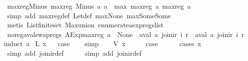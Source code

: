 \begin{isabellebody}
\ max{\isacharunderscore}reg{\isacharunderscore}Minus{\isacharcolon}\ {\isachardoublequoteopen}max{\isacharunderscore}reg\ {\isacharparenleft}Minus\ a{}\ a{}{\isacharparenright}\ {\isacharequal}\ max\ {\isacharparenleft}max{\isacharunderscore}reg\ a{}{\isacharparenright}\ {\isacharparenleft}max{\isacharunderscore}reg\ a{}{\isacharparenright}{\isachardoublequoteclose}\isanewline
%
\isadelimproof
\ \ %
\endisadelimproof
%
\isatagproof
{}\isamarkupfalse%
\ {\isacharparenleft}simp\ add{\isacharcolon}\ max{\isacharunderscore}reg{\isacharunderscore}def\ Let{\isacharunderscore}def\ max{\isacharunderscore}None\ max{\isacharunderscore}Some{\isacharunderscore}Some{\isacharparenright}\isanewline
\ \ \isamarkupfalse%
\ {\isacharparenleft}metis\ List{\isachardot}finite{\isacharunderscore}set\ Max{\isachardot}union\ enumerate{\isacharunderscore}aexp{\isacharunderscore}regs{\isacharunderscore}list{\isacharparenright}%
\endisatagproof
{\isafoldproof}%
%
\isadelimproof
\isanewline
%
\endisadelimproof
\isanewline
{}\isamarkupfalse%
\ no{\isacharunderscore}reg{\isacharunderscore}aval{\isacharunderscore}swap{\isacharunderscore}regs{\isacharcolon}\ {\isachardoublequoteopen}AExp{\isachardot}max{\isacharunderscore}reg\ a\ {\isacharequal}\ None\ {\isasymLongrightarrow}\ aval\ a\ {\isacharparenleft}join{\isacharunderscore}ir\ i\ r{\isacharparenright}\ {\isacharequal}\ aval\ a\ {\isacharparenleft}join{\isacharunderscore}ir\ i\ r{\isacharprime}{\isacharparenright}{\isachardoublequoteclose}\isanewline
%
\isadelimproof
%
\endisadelimproof
%
\isatagproof
{}\isamarkupfalse%
{\isacharparenleft}induct\ a{\isacharparenright}\isanewline
{}\isamarkupfalse%
\ {\isacharparenleft}L\ x{\isacharparenright}\isanewline
{}\isamarkupfalse%
\ \isamarkupfalse%
\ {\isacharquery}case\isanewline
\ \ \isamarkupfalse%
\ simp\isanewline
{}\isamarkupfalse%
\isanewline
\ \ \isamarkupfalse%
\ {\isacharparenleft}V\ x{\isacharparenright}\isanewline
\ \ \isamarkupfalse%
\ \isamarkupfalse%
\ {\isacharquery}case\isanewline
\ \ \ \ \isamarkupfalse%
\ {\isacharparenleft}cases\ x{\isacharparenright}\isanewline
\ \ \ \ \ \isamarkupfalse%
\ {\isacharparenleft}simp\ add{\isacharcolon}\ join{\isacharunderscore}ir{\isacharunderscore}def{\isacharparenright}\isanewline
\ \ \ \ \isamarkupfalse%
\ {\isacharparenleft}simp\ add{\isacharcolon}\ join{\isacharunderscore}ir{\isacharunderscore}def{\isacharparenright}\isanewline

\end{isabellebody}
